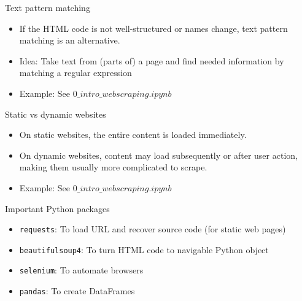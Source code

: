 \begin{frame}{Text pattern matching}
\begin{itemize}
	\item If the HTML code is not well-structured or names change, text pattern matching is an alternative.
	\item Idea: Take text from (parts of) a page and find needed information by matching a regular expression
	\item Example: See $0\_intro\_webscraping.ipynb$
\end{itemize}
\end{frame}

\begin{frame}{Static vs dynamic websites}
\begin{itemize}
	\item On static websites, the entire content is loaded immediately.
	\item On dynamic websites, content may load subsequently or after user action, making them usually more complicated to scrape.
	\item Example: See $0\_intro\_webscraping.ipynb$
\end{itemize}
\end{frame}

\begin{frame}{Important Python packages}
\begin{itemize}
	\item {\tt requests}: To load URL and recover source code (for static web pages)
	\item {\tt beautifulsoup4}: To turn HTML code to navigable Python object
	\item {\tt selenium}: To automate browsers
	\item {\tt pandas}: To create DataFrames
\end{itemize}

\end{frame}